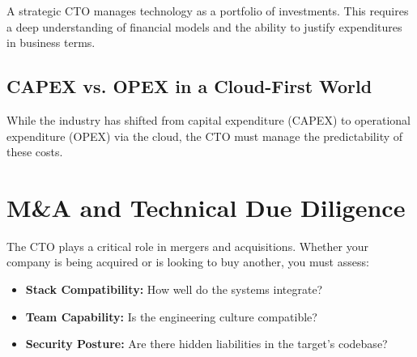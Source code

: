 A strategic CTO manages technology as a portfolio of investments. This requires a deep understanding of financial models and the ability to justify expenditures in business terms.

\subsection{CAPEX vs. OPEX in a Cloud-First World}

While the industry has shifted from capital expenditure (CAPEX) to operational expenditure (OPEX) via the cloud, the CTO must manage the predictability of these costs.

\section{M\&A and Technical Due Diligence}

The CTO plays a critical role in mergers and acquisitions. Whether your company is being acquired or is looking to buy another, you must assess:

\begin{itemize}
    \item \textbf{Stack Compatibility:} How well do the systems integrate?
    \item \textbf{Team Capability:} Is the engineering culture compatible?
    \item \textbf{Security Posture:} Are there hidden liabilities in the target's codebase?
\end{itemize}
